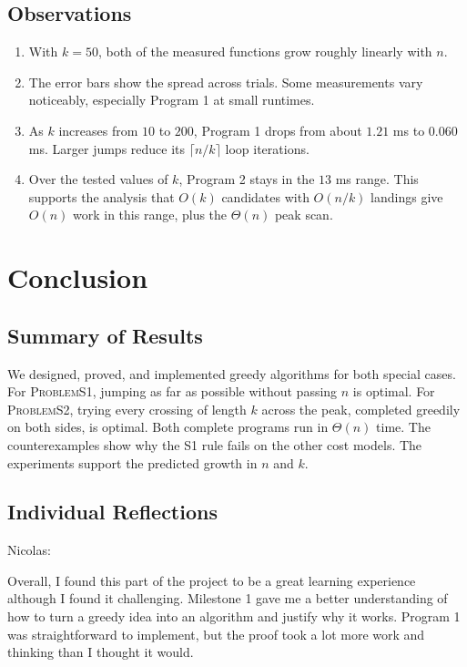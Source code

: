 \documentclass{article}
\begin{document}
\subsection{Observations}
\begin{enumerate}
    \item With $k=50$, both of the measured functions grow roughly linearly with $n$.
    \item The error bars show the spread across trials. Some measurements vary noticeably, especially Program 1 at small runtimes. 
    \item As $k$ increases from $10$ to $200$, Program 1 drops from about $1.21$ ms to $0.060$ ms. Larger jumps reduce its $\lceil n/k\rceil$ loop iterations.
    \item Over the tested values of $k$, Program 2 stays in the  $13$ ms range. This supports the analysis that $O(k)$ candidates with $O(n/k)$ landings give $O(n)$ work in this range, plus the $\Theta(n)$ peak scan.
\end{enumerate}

\section{Conclusion}

\subsection{Summary of Results}
We designed, proved, and implemented greedy algorithms for both special cases. For \textsc{ProblemS1}, jumping as far as possible without passing $n$ is optimal. For \textsc{ProblemS2}, trying every crossing of length $k$ across the peak, completed greedily on both sides, is optimal. Both complete programs run in $\Theta(n)$ time. The counterexamples show why the S1 rule fails on the other cost models. The experiments support the predicted growth in $n$ and $k$.


\subsection{Individual Reflections}
\medskip
\noindent Nicolas:

Overall, I found this part of the project to be a great learning experience although I found it challenging. Milestone 1 gave me a better understanding of how to turn a greedy idea into an algorithm and justify why it works. Program 1 was straightforward to implement, but the proof took a lot more work and thinking than I thought it would. 
\end{document}
